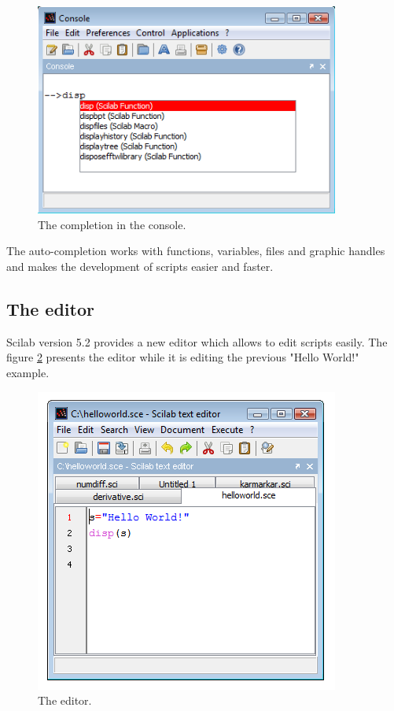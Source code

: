 \begin{figure}
\begin{center}
\includegraphics[width=10cm]{introscilab/console_completion.png}
\end{center}
\caption{The completion in the console.}
\label{fig-scilab-console}
\end{figure}

The auto-completion works with functions, variables, files and graphic 
handles and makes the development of scripts easier and faster.

\subsection{The editor}

Scilab version 5.2 provides a new editor which allows to edit scripts easily. 
The figure \ref{fig-scilab-editorhelloworld} presents the editor while 
it is editing the previous "Hello World!" example.

\begin{figure}
\begin{center}
\includegraphics[width=10cm]{introscilab/editor-helloworld.png}
\end{center}
\caption{The editor.}
\label{fig-scilab-editorhelloworld}
\end{figure}


